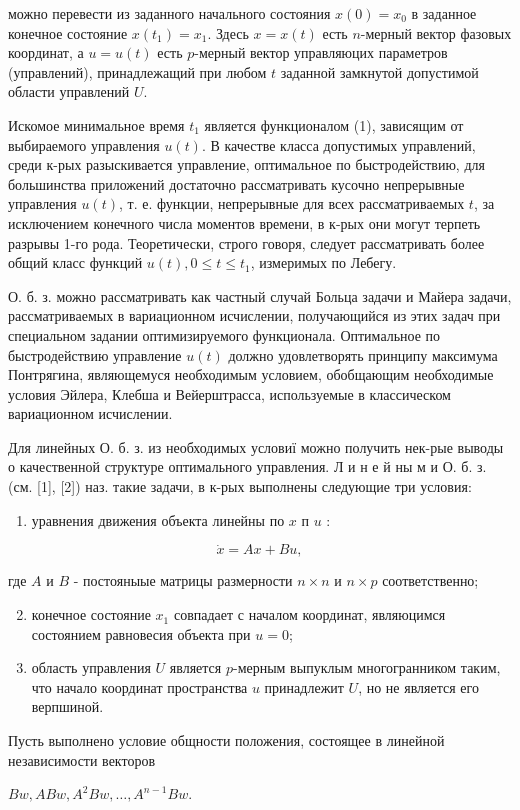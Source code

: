 \documentclass[10pt]{article}
\begin{document}
можно перевести из заданного начального состояния $x(0)=x_{0}$ в заданное конечное состояние $x\left(t_{1}\right)=x_{1}$. Здесь $x=x(t)$ есть $n$-мерный вектор фазовых координат, а $u=u(t)$ есть $p$-мерный вектор управляюцих параметров (управлений), принадлежащий при любом $t$ заданной замкнутой допустимой области управлений $U$.

Искомое минимальное время $t_{1}$ является функционалом (1), зависящим от выбираемого управления $u(t)$. В качестве класса допустимых управлений, среди к-рых разыскивается управление, оптимальное по быстродействию, для большинства приложений достаточно рассматривать кусочно непрерывные управления $u(t)$, т. е. функции, непрерывные для всех рассматриваемых $t$, за исключением конечного числа моментов времени, в к-рых они могут терпеть разрывы 1-го рода. Теоретически, строго говоря, следует рассматривать более общий класс функций $u(t), 0 \leqslant t \leqslant t_{1}$, измеримых по Лебегу.

О. б. з. можно рассматривать как частный случай Больца задачи и Майера задачи, рассматриваемых в вариационном исчислении, получающийся из этих задач при специальном задании оптимизируемого функционала. Оптимальное по быстродействию управление $u(t)$ должно удовлетворять принципу максимума Понтрягина, являющемуся необходимым условием, обобщающим необходимые условия Эйлера, Клебша и Вейерштрасса, используемые в классическом вариационном исчислении.

Для линейных О. б. з. из необходимых условиї можно получить нек-рые выводы $о$ качественной структуре оптимального управления. Л и н е й ны м и О. б. з. (см. [1], [2]) наз. такие задачи, в к-рых выполнены следующие три условия:

\begin{enumerate}
  \item уравнения движения объекта линейны по $x$ п $u$ :
\end{enumerate}

\[
\dot{x}=A x+B u,
\]

где $A$ и $B$ - постояныые матрицы размерности $n \times n$ и $n \times p$ соответственно;

\begin{enumerate}
  \setcounter{enumi}{1}
  \item конечное состояние $x_{1}$ совпадает с началом координат, являюцимся состоянием равновесия объекта при $u=0$;

  \item область управления $U$ является $p$-мерным выпуклым многогранником таким, что начало координат пространства $u$ принадлежит $U$, но не является его верпшиной.

\end{enumerate}

Пусть выполнено условие общности положения, состоящее в линейной независимости векторов

$B w, A B w, A^{2} B w, \ldots, A^{n-1} B w$.
\end{document}
